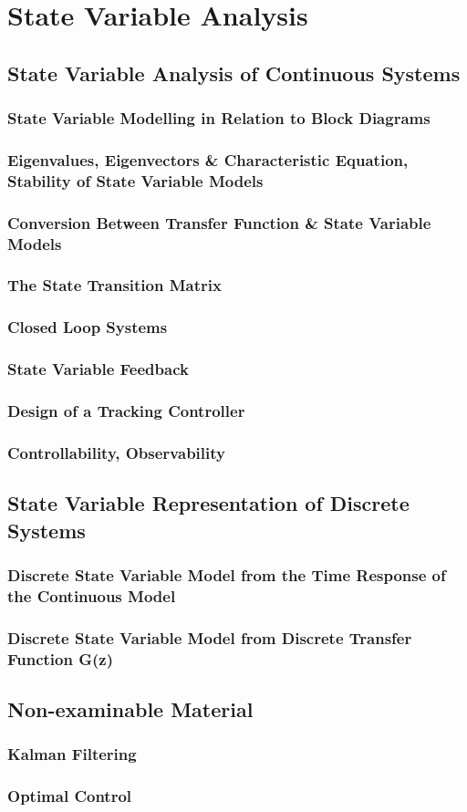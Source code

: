 \chapter{State Variable Analysis}

\newpage
\section{State Variable Analysis of Continuous Systems}
\subsection{State Variable Modelling in Relation to Block Diagrams}
\subsection{Eigenvalues, Eigenvectors \& Characteristic Equation, Stability of State Variable Models}
\subsection{Conversion Between Transfer Function \& State Variable Models}
\subsection{The State Transition Matrix}
\subsection{Closed Loop Systems}
\subsection{State Variable Feedback}
\subsection{Design of a Tracking Controller}
\subsection{Controllability, Observability}

\newpage
\section{State Variable Representation of Discrete Systems}
\subsection{Discrete State Variable Model from the Time Response of the Continuous Model}
\subsection{Discrete State Variable Model from Discrete Transfer Function G(z)}

\newpage
\section{Non-examinable Material}
\subsection{Kalman Filtering}
\subsection{Optimal Control}

